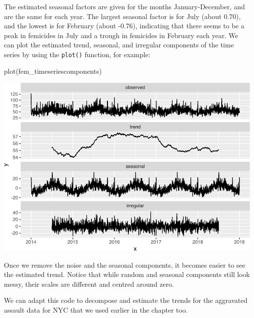 \documentclass[
  krantz2]{krantz}
\makeatletter
\newenvironment{Shaded}{\begin{snugshade}}{\end{snugshade}}
\newcommand{\FunctionTok}[1]{\textcolor[rgb]{0,0,0}{#1}}
\newcommand{\NormalTok}[1]{#1}
\newenvironment{kframe}{%
\medskip{}
\setlength{\fboxsep}{.8em}
 \def\at@end@of@kframe{}%
 \ifinner\ifhmode%
  \def\at@end@of@kframe{\end{minipage}}%
  \begin{minipage}{\columnwidth}%
 \fi\fi%
 \def\FrameCommand##1{\hskip\@totalleftmargin \hskip-\fboxsep
 \colorbox{shadecolor}{##1}\hskip-\fboxsep
     \hskip-\linewidth \hskip-\@totalleftmargin \hskip\columnwidth}%
 \MakeFramed {\advance\hsize-\width
   \@totalleftmargin\z@ \linewidth\hsize
   \@setminipage}}%
 {\par\unskip\endMakeFramed%
 \at@end@of@kframe}
\renewenvironment{Shaded}{\begin{kframe}}{\end{kframe}}
\makeatother
\begin{document}
The estimated seasonal factors are given for the months January-December, and are the same for each year. The largest seasonal factor is for July (about 0.70), and the lowest is for February (about -0.76), indicating that there seems to be a peak in femicides in July and a trough in femicides in February each year. We can plot the estimated trend, seasonal, and irregular components of the time series by using the \texttt{plot()} function, for example:

\begin{Shaded}
\begin{Highlighting}[]
\FunctionTok{plot}\NormalTok{(fem\_timeseriescomponents)}
\end{Highlighting}
\end{Shaded}

\includegraphics{crime_mapping_files/figure-latex/unnamed-chunk-177-1.pdf}

Once we remove the noise and the seasonal components, it becomes easier to see the estimated trend. Notice that while random and seasonal components still look messy, their scales are different and centred around zero.

We can adapt this code to decompose and estimate the trends for the aggravated assault data for NYC that we used earlier in the chapter too.
\end{document}
